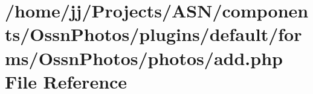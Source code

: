 \hypertarget{components_2_ossn_photos_2plugins_2default_2forms_2_ossn_photos_2photos_2add_8php}{}\section{/home/jj/\+Projects/\+A\+S\+N/components/\+Ossn\+Photos/plugins/default/forms/\+Ossn\+Photos/photos/add.php File Reference}
\label{components_2_ossn_photos_2plugins_2default_2forms_2_ossn_photos_2photos_2add_8php}
